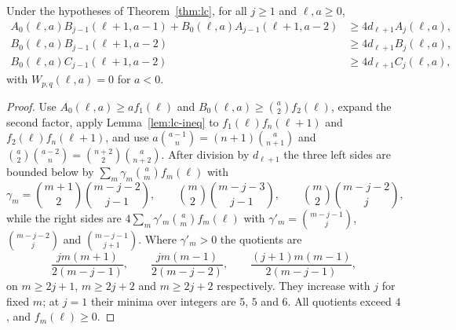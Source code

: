 \begin{lemma}\label{lem:detours}
Under the hypotheses of Theorem~\ref{thm:lc}, for all $j\geq1$ and $\ell,a\geq0$,
\[
\begin{aligned}
A_0(\ell,a)B_{j-1}(\ell+1,a-1)+B_0(\ell,a)A_{j-1}(\ell+1,a-2)&\geq4d_{\ell+1}A_j(\ell,a),\\
B_0(\ell,a)B_{j-1}(\ell+1,a-2)&\geq4d_{\ell+1}B_j(\ell,a),\\
B_0(\ell,a)C_{j-1}(\ell+1,a-2)&\geq4d_{\ell+1}C_j(\ell,a),
\end{aligned}
\]
with $W_{p,q}(\ell,a)=0$ for $a<0$.
\end{lemma}
\begin{proof}
Use $A_0(\ell,a)\geq af_1(\ell)$ and $B_0(\ell,a)\geq\binom a2f_2(\ell)$, expand the second factor, apply Lemma~\ref{lem:lc-ineq} to $f_1(\ell)f_n(\ell+1)$ and $f_2(\ell)f_n(\ell+1)$, and use $a\binom{a-1}n=(n+1)\binom a{n+1}$ and $\binom a2\binom{a-2}n=\binom{n+2}2\binom a{n+2}$. After division by $d_{\ell+1}$ the three left sides are bounded below by $\sum_m\gamma_m\binom amf_m(\ell)$ with
\[
\gamma_m=\binom{m+1}2\binom{m-j-2}{j-1},\qquad\binom m2\binom{m-j-3}{j-1},\qquad\binom m2\binom{m-j-2}j,
\]
while the right sides are $4\sum_m\gamma'_m\binom amf_m(\ell)$ with $\gamma'_m=\binom{m-j-1}j$, $\binom{m-j-2}j$ and $\binom{m-j-1}{j+1}$. Where $\gamma'_m>0$ the quotients are
\[
\frac{jm(m+1)}{2(m-j-1)},\qquad\frac{jm(m-1)}{2(m-j-2)},\qquad\frac{(j+1)m(m-1)}{2(m-j-1)},
\]
on $m\geq2j+1$, $m\geq2j+2$ and $m\geq2j+2$ respectively. They increase with $j$ for fixed $m$; at $j=1$ their minima over integers are $5$, $5$ and $6$. All quotients exceed $4$, and $f_m(\ell)\geq0$.
\end{proof}

